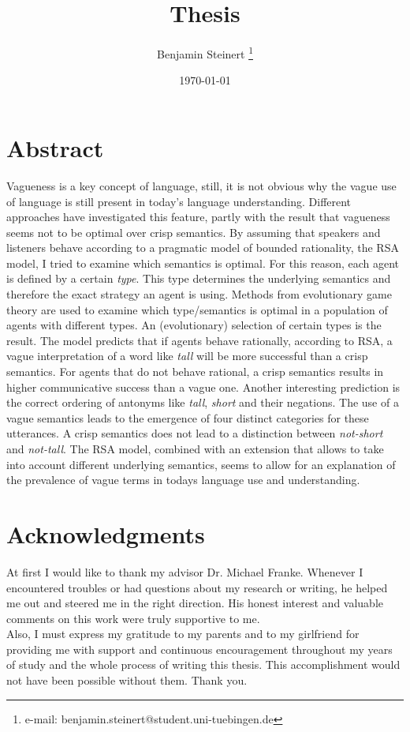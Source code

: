 \documentclass[a4paper,cleardoubleempty,BCOR1cm]{scrbook}
\title{Thesis}
\author{Benjamin Steinert \thanks{e-mail: benjamin.steinert@student.uni-tuebingen.de}}
\date{\today}
\begin{document}


\chapter*{Abstract}
Vagueness is a key concept of language, still, it is not obvious why the vague use of language is still present in today's language understanding. Different approaches have investigated this feature, partly with the result that vagueness seems not to be optimal over crisp semantics. By assuming that speakers and listeners behave according to a pragmatic model of bounded rationality, the RSA model, I tried to examine which semantics is optimal. For this reason, each agent is defined by a certain \textit{type}. This type determines the underlying semantics and therefore the exact strategy an agent is using. Methods from evolutionary game theory are used to examine which type/semantics is optimal in a population of agents with different types. An (evolutionary) selection of certain types is the result. The model predicts that if agents behave rationally, according to RSA, a vague interpretation of a word like \textit{tall} will be more successful than a crisp semantics. For agents that do not behave rational, a crisp semantics results in higher communicative success than a vague one. Another interesting prediction is the correct ordering of antonyms like \textit{tall}, \textit{short} and their negations. The use of a vague semantics leads to the emergence of four distinct categories for these utterances. A crisp semantics does not lead to a distinction between \textit{not-short} and \textit{not-tall}. The RSA model, combined with an extension that allows to take into account different underlying semantics, seems to allow for an explanation of the prevalence of vague terms in todays language use and understanding.

\chapter*{Acknowledgments}
At first I would like to thank my advisor Dr. Michael Franke. Whenever I encountered troubles or had questions about my research or writing, he helped me out and steered me in the right direction. His honest interest and valuable comments on this work were truly supportive to me.\\

Also, I must express my gratitude to my parents and to my girlfriend for providing me with support and continuous encouragement throughout my years of study and the whole process of writing this thesis. This accomplishment would not have been possible without them. Thank you.

\tableofcontents










\end{document}
